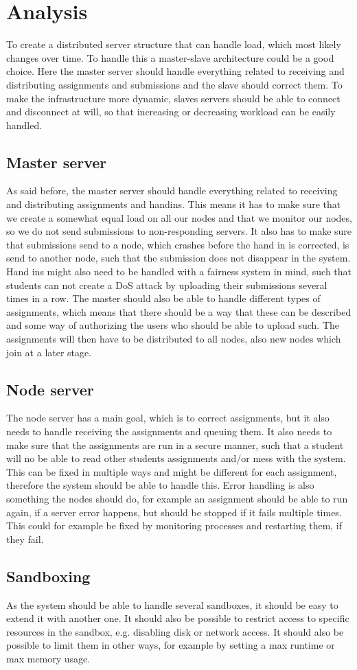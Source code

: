 \section{Analysis}
To create a distributed server structure that can handle load, which most
likely changes over time. To handle this a master-slave architecture could be
a good choice. Here the master server should handle everything related to
receiving and distributing assignments and submissions and the slave should
correct them. To make the infrastructure more dynamic, slaves servers should be
able to connect and disconnect at will, so that increasing or decreasing
workload can be easily handled.

\subsection{Master server}
As said before, the master server should handle everything related to receiving
and distributing assignments and handins. This means it has to make sure that we
create a somewhat equal load on all our nodes and that we monitor our nodes, so
we do not send submissions to non-responding servers. It also has to make sure
that submissions send to a node, which crashes before the hand in is corrected,
is send to another node, such that the submission does not disappear in the
system.
Hand ins might also need to be handled with a fairness system in mind, such that
students can not create a DoS attack by uploading their submissions several
times in a row.
The master should also be able to handle different types of assignments, which
means that there should be a way that these can be described and some way of
authorizing the users who should be able to upload such.
The assignments will then have to be distributed to all nodes, also new nodes
which join at a later stage.

\subsection{Node server}
The node server has a main goal, which is to correct assignments, but it also
needs to handle receiving the assignments and queuing them. It also needs to
make sure that the assignments are run in a secure manner, such that a student
will no be able to read other students assignments and/or mess with the system.
This can be fixed in multiple ways and might be different for each assignment,
therefore the system should be able to handle this.
Error handling is also something the nodes should do, for example an assignment
should be able to run again, if a server error happens, but should be stopped if
it fails multiple times. This could for example be fixed by monitoring processes
and restarting them, if they fail.

\subsection{Sandboxing}
As the system should be able to handle several sandboxes, it should be easy to
extend it with another one. It should also be possible to restrict access to
specific resources in the sandbox, e.g. disabling disk or network access.
It should also be possible to limit them in other ways, for example by setting
a max runtime or max memory usage.
